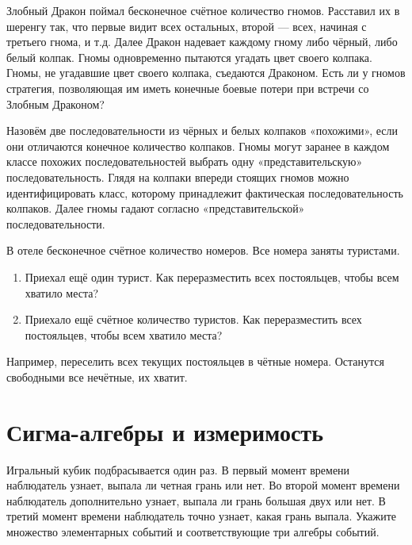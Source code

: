 \begin{problem}
Злобный Дракон поймал бесконечное счётное количество гномов. Расставил их в шеренгу так, что первые видит всех остальных, второй --- всех, начиная с третьего гнома, и т.д. Далее Дракон надевает каждому гному либо чёрный, либо белый колпак. Гномы одновременно пытаются угадать цвет своего колпака. Гномы, не угадавшие цвет своего колпака, съедаются Драконом. Есть ли у гномов стратегия, позволяющая им иметь конечные боевые потери при встречи со Злобным Драконом?
\end{problem}
\begin{solution}
Назовём две последовательности из чёрных и белых колпаков «похожими», если они отличаются конечное количество колпаков. Гномы могут заранее в каждом классе похожих последовательностей выбрать одну «представительскую» последовательность. Глядя на колпаки впереди стоящих гномов можно идентифицировать класс, которому принадлежит фактическая последовательность колпаков. Далее гномы гадают согласно «представительской» последовательности.
\end{solution}


\begin{problem}
В отеле бесконечное счётное количество номеров. Все номера заняты туристами. 
\begin{enumerate}
\item Приехал ещё один турист. Как переразместить всех постояльцев, чтобы всем хватило места?
\item Приехало ещё счётное количество туристов. Как переразместить всех постояльцев, чтобы всем хватило места?
\end{enumerate}
\end{problem}
\begin{solution}
Например, переселить всех текущих постояльцев в чётные номера. Останутся свободными все нечётные, их хватит.
\end{solution}


\section{Сигма-алгебры и измеримость} 

\begin{problem}
Игральный кубик подбрасывается один раз. В первый момент времени
наблюдатель узнает, выпала ли четная грань или нет. Во второй
момент времени наблюдатель дополнительно узнает, выпала ли грань большая двух
или нет. В третий момент времени наблюдатель точно узнает, какая
грань выпала. Укажите множество элементарных событий и
соответствующие три алгебры событий. 

\end{problem} 
\begin{solution} 


\end{solution}

